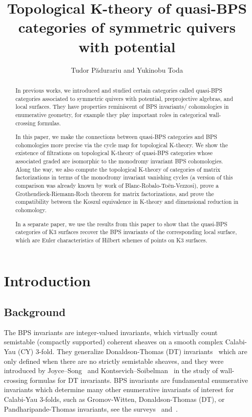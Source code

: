 \documentclass [11pt,oneside,a4paper,mathscr]{amsart}
\title[Topological K-theory of quasi-BPS categories]{Topological K-theory of quasi-BPS categories of symmetric quivers with potential}
\author{Tudor P\u{a}durariu and Yukinobu Toda}
\theoremstyle{definition}
\begin{document}
	

\begin{abstract}
In previous works, we introduced and studied certain categories called quasi-BPS categories associated to
symmetric quivers with potential, preprojective algebras, 
and local surfaces. 
They have properties reminiscent of BPS 
invariants/ cohomologies in enumerative geometry, for example they play
important roles in categorical wall-crossing 
formulas. 

In this paper, we make the connections between quasi-BPS categories and BPS cohomologies more precise
via the cycle map for topological K-theory. 
We show the existence of filtrations on 
topological K-theory of quasi-BPS categories whose 
associated graded are isomorphic to the 
monodromy invariant BPS cohomologies. 
Along the way, we also compute the topological K-theory of categories of matrix factorizations
in terms of the monodromy invariant vanishing cycles (a version of this comparison was already known by work of Blanc-Robalo-Toën-Vezzosi), prove a Grothendieck-Riemann-Roch theorem for matrix factorizations, and prove the compatibility between the Koszul equivalence in K-theory and dimensional reduction in cohomology.

In a separate paper, we use the results from this paper 
to show that the quasi-BPS categories of K3 surfaces recover the 
BPS invariants of the corresponding local surface, which are Euler characteristics of Hilbert schemes of
points on K3 surfaces. 


\end{abstract}

\maketitle


 \setcounter{tocdepth}{2}
\tableofcontents

\section{Introduction}
\subsection{Background}

The BPS invariants are integer-valued invariants, which virtually 
count semistable (compactly supported) coherent 
sheaves on a smooth complex Calabi-Yau (CY) $3$-fold. 
They generalize Donaldson-Thomas (DT) invariants~\cite{Thom} which are only defined when there are no strictly semistable sheaves, 
and they were introduced by Joyce--Song~\cite{JS} and Kontsevich--Soibelman~\cite{K-S}
in the study of wall-crossing formulas for DT invariants. 
BPS invariants are fundamental enumerative invariants which determine many other enumerative invariants of interest for Calabi-Yau $3$-folds, such as Gromov-Witten, Donaldson-Thomas (DT), or Pandharipande-Thomas invariants, 
see the surveys~\cite[Section 2 and a half]{MR3221298} and~\cite[Section~6]{Tsurvey}. 
\end{document}
